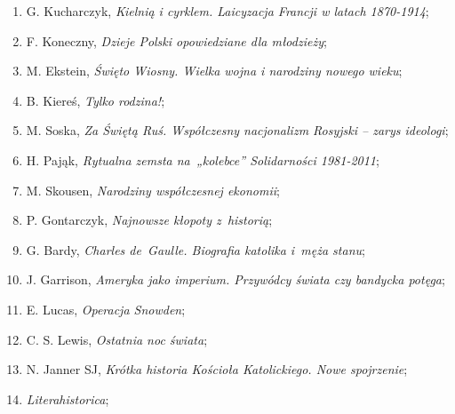 \documentclass[a4paper,11pt]{article}
\begin{document}
\begin{enumerate}
\item G. Kucharczyk, \textit{Kielnią i cyrklem. Laicyzacja Francji w
    latach 1870-1914};



\item F. Koneczny, \textit{Dzieje Polski opowiedziane dla młodzieży};



\item M. Ekstein, \textit{Święto Wiosny. Wielka wojna i narodziny nowego
    wieku};



\item B. Kiereś, \textit{Tylko rodzina!};



\item M. Soska, \textit{Za Świętą Ruś. Współczesny nacjonalizm Rosyjski
    -- zarys ideologi};



\item H. Pająk, \textit{Rytualna zemsta na~„kolebce” Solidarności
    1981-2011};



\item M. Skousen, \textit{Narodziny współczesnej ekonomii};



\item P. Gontarczyk, \textit{Najnowsze kłopoty z~historią};



\item G. Bardy, \textit{Charles de~Gaulle. Biografia katolika i~męża
    stanu};



\item J. Garrison, \textit{Ameryka jako imperium. Przywódcy świata czy
    bandycka potęga};



\item E. Lucas, \textit{Operacja Snowden};



\item C. S. Lewis, \textit{Ostatnia noc świata};



\item N. Janner SJ, \textit{Krótka historia Kościoła Katolickiego. Nowe
    spojrzenie};



\item \textit{Literahistorica};




\end{enumerate}
\end{document}

